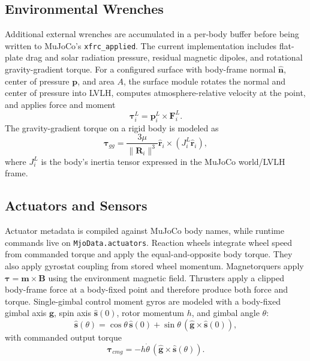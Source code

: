 \subsection{Environmental Wrenches}

Additional external wrenches are accumulated in a per-body buffer before
being written to MuJoCo's \texttt{xfrc\_applied}. The current implementation
includes flat-plate drag and solar radiation pressure, residual magnetic
dipoles, and rotational gravity-gradient torque. For a configured surface
with body-frame normal $\hat{\bm n}$, center of pressure $\bm p$, and area
$A$, the surface module rotates the normal and center of pressure into LVLH,
computes atmosphere-relative velocity at the point, and applies force and
moment
\begin{equation}
  \bm\tau_i^L = \bm p_i^L \times \bm F_i^L.
\end{equation}
The gravity-gradient torque on a rigid body is modeled as
\begin{equation}
  \bm\tau_{gg}
    = \frac{3\mu}{\|\bm R_i\|^3}
      \hat{\bm r}_i \times \left(J_i^L \hat{\bm r}_i\right),
  \label{eq:gravity-gradient}
\end{equation}
where $J_i^L$ is the body's inertia tensor expressed in the MuJoCo world/LVLH
frame.

\subsection{Actuators and Sensors}

Actuator metadata is compiled against MuJoCo body names, while runtime
commands live on \texttt{MjoData.actuators}. Reaction wheels integrate wheel
speed from commanded torque and apply the equal-and-opposite body torque.
They also apply gyrostat coupling from stored wheel momentum. Magnetorquers
apply $\bm\tau = \bm m \times \bm B$ using the environment magnetic field.
Thrusters apply a clipped body-frame force at a body-fixed point and therefore
produce both force and torque. Single-gimbal control moment gyros are modeled
with a body-fixed gimbal axis $\hat{\bm g}$, spin axis
$\hat{\bm s}(0)$, rotor momentum $h$, and gimbal angle $\theta$:
\begin{equation}
  \hat{\bm s}(\theta)
    = \cos\theta\,\hat{\bm s}(0)
      + \sin\theta\,\left(\hat{\bm g}\times\hat{\bm s}(0)\right),
\end{equation}
with commanded output torque
\begin{equation}
  \bm\tau_{cmg}
    = -h\dot\theta\,
      \left(\hat{\bm g}\times\hat{\bm s}(\theta)\right).
\end{equation}

